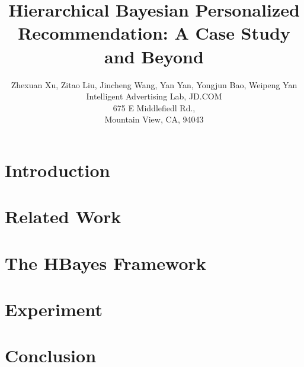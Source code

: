 \documentclass[letterpaper]{article}
\begin{document}
%
\title{Hierarchical Bayesian Personalized Recommendation: A Case Study and Beyond}
\author{Zhexuan Xu, Zitao Liu, Jincheng Wang, Yan Yan, Yongjun Bao, Weipeng Yan\\
Intelligent Advertising Lab, JD.COM\\
675 E Middlefiedl Rd.,\\
Mountain View, CA, 94043\\
}

\maketitle
\begin{abstract}
\begin{quote}

\end{quote}
\end{abstract}
\section{Introduction}
\label{sec:intro}


\section{Related Work}
\label{sec:related}


\section{The HBayes Framework}
\label{sec:method}


\section{Experiment}
\label{sec:experiment}


\section{Conclusion}
\label{sec:conclusion}




\end{document}
